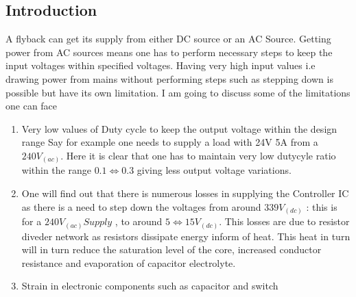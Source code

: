 \documentclass{article}
\begin{document}
\subsection[Introduction]{Introduction}
    A flyback can get its supply from either DC source or an AC Source. Getting power from AC sources
    means one has to perform necessary steps to keep the input voltages within specified voltages.
    Having very high input values i.e drawing power from mains without performing steps such as stepping 
    down is possible but have its own limitation. I am going to discuss some of the limitations one can face
    \begin{enumerate}
        \item Very low values of Duty cycle to keep the output voltage within the design range
            Say for example one needs to supply a load with 24V 5A from a $240V_(ac)$. Here it is clear that 
            one has to maintain very low dutycyle ratio within the range $0.1 \Leftrightarrow 0.3$ giving less
            output voltage variations.
        \item One will find out that there is numerous losses in supplying the Controller IC as there is a need to step down the
        voltages from around $339 V_(dc)$ : this is for a $240V_(ac) Supply$ , to around $ 5 \Leftrightarrow 15 V_(dc)$. This losses are due to resistor diveder network as resistors dissipate energy inform of
        heat. This heat in turn will in turn reduce the saturation level of the core, increased conductor resistance and evaporation of capacitor electrolyte.

        \item Strain in electronic components such as capacitor and  switch
    \end{enumerate}
\end{document}
